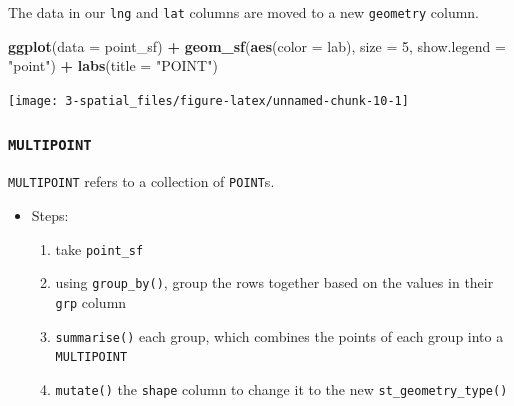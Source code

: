 \documentclass[
]{report}
\newenvironment{Shaded}{\begin{snugshade}}{\end{snugshade}}
\newcommand{\DataTypeTok}[1]{\textcolor[rgb]{0.13,0.29,0.53}{#1}}
\newcommand{\DecValTok}[1]{\textcolor[rgb]{0.00,0.00,0.81}{#1}}
\newcommand{\KeywordTok}[1]{\textcolor[rgb]{0.13,0.29,0.53}{\textbf{#1}}}
\newcommand{\NormalTok}[1]{#1}
\newcommand{\OperatorTok}[1]{\textcolor[rgb]{0.81,0.36,0.00}{\textbf{#1}}}
\newcommand{\StringTok}[1]{\textcolor[rgb]{0.31,0.60,0.02}{#1}}
\providecommand{\tightlist}{%
  \setlength{\itemsep}{0pt}\setlength{\parskip}{0pt}}
\begin{document}
The data in our \texttt{lng} and \texttt{lat} columns are moved to a new \texttt{geometry} column.

\begin{Shaded}
\begin{Highlighting}[]
\KeywordTok{ggplot}\NormalTok{(}\DataTypeTok{data =}\NormalTok{ point\_sf) }\OperatorTok{+}\StringTok{ }
\StringTok{  }\KeywordTok{geom\_sf}\NormalTok{(}\KeywordTok{aes}\NormalTok{(}\DataTypeTok{color =}\NormalTok{ lab), }\DataTypeTok{size =} \DecValTok{5}\NormalTok{, }\DataTypeTok{show.legend =} \StringTok{"point"}\NormalTok{) }\OperatorTok{+}
\StringTok{  }\KeywordTok{labs}\NormalTok{(}\DataTypeTok{title =} \StringTok{"POINT"}\NormalTok{)}
\end{Highlighting}
\end{Shaded}

\begin{center}\texttt{[image: 3-spatial\_files/figure-latex/unnamed-chunk-10-1]} \end{center}

\hypertarget{multipoint}{%
\subsubsection{\texorpdfstring{\texttt{MULTIPOINT}}{MULTIPOINT}}\label{multipoint}}

\texttt{MULTIPOINT} refers to a collection of \texttt{POINT}s.

\begin{itemize}
\tightlist
\item
  Steps:

  \begin{enumerate}
  \def\labelenumi{\arabic{enumi}.}
  \tightlist
  \item
    take \texttt{point\_sf}
  \item
    using \texttt{group\_by()}, group the rows together based on the values in their \texttt{grp} column
  \item
    \texttt{summarise()} each group, which combines the points of each group into a \texttt{MULTIPOINT}
  \item
    \texttt{mutate()} the \texttt{shape} column to change it to the new \texttt{st\_geometry\_type()}
  \end{enumerate}
\end{itemize}
\end{document}
